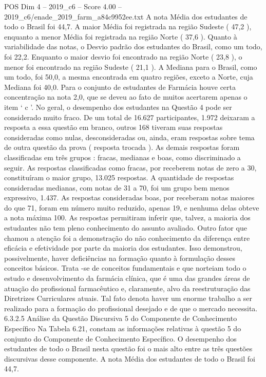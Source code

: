 \begin{textsample}{POS Dim 4 – 2019\_c6 – Score 4.00 – 2019\_c6/enade\_2019\_farm\_a84c9952ee.txt}
A nota Média dos estudantes de todo o Brasil foi 44,7.
A maior Média foi registrada na região Sudeste ( 47,2 ), enquanto a menor Média foi registrada na região Norte ( 37,6 ).
Quanto à variabilidade das notas, o Desvio padrão dos estudantes do Brasil, como um todo, foi 22,2.
Enquanto o maior desvio foi encontrado na região Norte ( 23,8 ), o menor foi encontrado na região Sudeste ( 21,1 ).
A Mediana para o Brasil, como um todo, foi 50,0, a mesma encontrada em quatro regiões, exceto a Norte, cuja Mediana foi 40,0.
Para o conjunto de estudantes de Farmácia houve certa concentração na nota 2,0, que se deveu ao fato de muitos acertarem apenas o item ‘ c ’.
No geral, o desempenho dos estudantes na Questão 4 pode ser considerado muito fraco.
De um total de 16.627 participantes, 1.972 deixaram a resposta a essa questão em branco, outros 168 tiveram suas respostas consideradas como nulas, desconsideradas ou, ainda, eram respostas sobre tema de outra questão da prova ( resposta trocada ).
As demais respostas foram classificadas em três grupos : fracas, medianas e boas, como discriminado a seguir.
As respostas classificadas como fracas, por receberem notas de zero a 30, constituíram o maior grupo, 13.025 respostas.
A quantidade de respostas consideradas medianas, com notas de 31 a 70, foi um grupo bem menos expressivo, 1.437.
As respostas consideradas boas, por receberam notas maiores do que 71, foram em número muito reduzido, apenas 19, e nenhuma delas obteve a nota máxima 100.
As respostas permitiram inferir que, talvez, a maioria dos estudantes não tem pleno conhecimento do assunto avaliado.
Outro fator que chamou a atenção foi a demonstração do não conhecimento da diferença entre eficácia e efetividade por parte da maioria dos estudantes.
Isso demonstrou, possivelmente, haver deficiências na formação quanto à formulação desses conceitos básicos.
Trata -se de conceitos fundamentais e que norteiam todo o estudo e desenvolvimento da farmácia clínica, que é uma das grandes áreas de atuação do profissional farmacêutico e, claramente, alvo da reestruturação das Diretrizes Curriculares atuais.
Tal fato denota haver um enorme trabalho a ser realizado para a formação do profissional desejado e de que o mercado necessita. 6.3.2.5 Análise da Questão Discursiva 5 do Componente de Conhecimento Específico Na Tabela 6.21, constam as informações relativas à questão 5 do conjunto do Componente de Conhecimento Específico.
O desempenho dos estudantes de todo o Brasil nesta questão foi o mais alto entre as três questões discursivas desse componente.
A nota Média dos estudantes de todo o Brasil foi 44,7.

\end{textsample}
